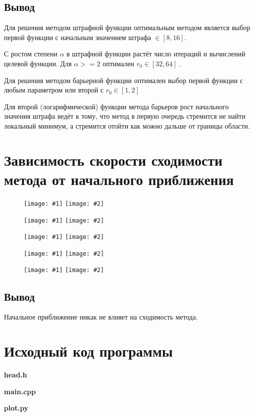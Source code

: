 \documentclass[12pt, a4paper]{article}
\newcommand{\myCodeInput}[3]{
{\bf #2}

}
\newcommand{\inputTwoImages}[2]{
\begin{figure}[htbp!]
    \noindent
        \texttt{[image: \#1]}
        \texttt{[image: \#2]}
\end{figure}

}
\begin{document}
\subsection{Вывод}

Для решения методом штрафной функции оптимальным методом является выбор первой функции с начальным значением штрафа $\in [8, 16]$.

С ростом степени $\alpha$ в штрафной функции растёт число итераций и вычислений целевой функции. Для $\alpha >= 2$ оптимален $r_0 \in [32, 64]$ .

Для решения методом барьерной функции оптимален выбор первой функции с любым параметром или второй с $r_0 \in [1, 2]$

Для второй (логарифмической) функции метода барьеров рост начального значения штрафа ведёт к тому, что метод в первую очередь стремится не найти локальный минимум, а стремится отойти как можно дальше от границы области.




\section{Зависимость скорости сходимости метода от начального приближения}
\inputTwoImages{../pics/Rosenbrock_Q1_1.png}{../pics/Rosenbrock_Q1_2.png}
\inputTwoImages{../pics/Rosenbrock_Q2_1.png}{../pics/Rosenbrock_Q2_2.png}
\inputTwoImages{../pics/Rosenbrock_Q3_1.png}{../pics/Rosenbrock_Q3_2.png}
\inputTwoImages{../pics/Rosenbrock_Q4_1.png}{../pics/Rosenbrock_Q4_2.png}
\inputTwoImages{../pics/Rosenbrock_Q5_1.png}{../pics/Rosenbrock_Q5_2.png}
\subsection{Вывод}

Начальное приближение никак не влияет на сходимость метода.



\section{Исходный код программы}
\myCodeInput{c++}{head.h}{../head.h}
\myCodeInput{c++}{main.cpp}{../main.cpp}
\myCodeInput{python}{plot.py}{../plot.py}
\end{document}

